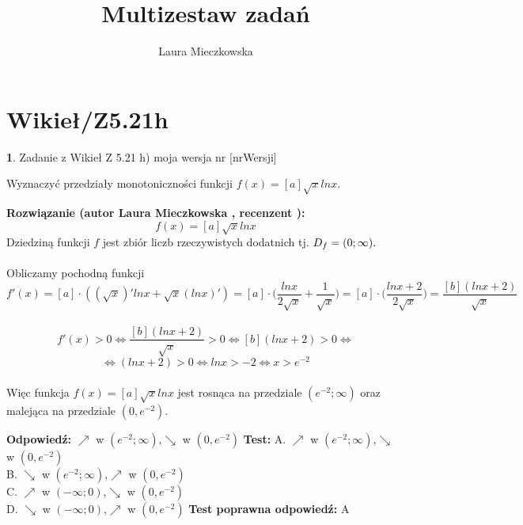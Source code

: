 \documentclass[12pt, a4paper]{article}
\title{Multizestaw zadań}
\author{Laura Mieczkowska}
\date{}
\theoremstyle{definition} %
\newtheorem{zad}{}
\newcommand{\kategoria}[1]{\section{#1}} %
\newcommand{\zadStart}[1]{\begin{zad}#1\newline} %
\newcommand{\zadStop}{\end{zad}}   %
\newcommand{\rozwStart}[2]{\noindent \textbf{Rozwiązanie (autor #1 , recenzent #2): }\newline} %
\newcommand{\odpStart}{\noindent \textbf{Odpowiedź:}\newline}    %
\newcommand{\odpStop}{\newline}                                             %
\newcommand{\testStart}{\noindent \textbf{Test:}\newline} %
\newcommand{\testStop}{\newline} %
\newcommand{\kluczStart}{\noindent \textbf{Test poprawna odpowiedź:}\newline} %
\newcommand{\kluczStop}{\newline} %
\begin{document}
\maketitle


\kategoria{Wikieł/Z5.21h}
\zadStart{Zadanie z Wikieł Z 5.21 h) moja wersja nr [nrWersji]}

Wyznaczyć przedziały monotoniczności funkcji $f(x)=[a]\sqrt{x}lnx$.
\zadStop
\rozwStart{Laura Mieczkowska}{}
$$f(x)=[a]\sqrt{x}lnx$$
Dziedziną funkcji $f$ jest zbiór liczb rzeczywistych dodatnich tj. $\mathnormal{D_f}=(0;\infty).$
\\\\Obliczamy pochodną funkcji
$$f'(x)=[a]\cdot((\sqrt{x})'lnx+\sqrt{x}(lnx)')=[a]\cdot\bigg(\frac{lnx}{2\sqrt{x}}+\frac{1}{\sqrt{x}}\bigg)=
[a]\cdot\bigg(\frac{lnx+2}{2\sqrt{x}}\bigg)=\frac{[b](lnx+2)}{\sqrt{x}}$$
\\
$$f'(x)>0\Leftrightarrow \frac{[b](lnx+2)}{\sqrt{x}}>0 \Leftrightarrow [b](lnx+2)>0 \Leftrightarrow$$
$$\Leftrightarrow (lnx+2)>0 \Leftrightarrow lnx>-2 \Leftrightarrow x>e^{-2}$$
\\Więc funkcja $f(x)=[a]\sqrt{x}lnx$ jest rosnąca na przedziale $(e^{-2};\infty)$ oraz malejąca na przedziale $(0,e^{-2})$.

\odpStart
$\nearrow$ w $(e^{-2};\infty)$,$\searrow$ w $(0,e^{-2})$
\odpStop
\testStart
A. $\nearrow$ w $(e^{-2};\infty)$,$\searrow$ w $(0,e^{-2})$\\
B. $\searrow$ w $(e^{-2};\infty)$,$\nearrow$ w $(0,e^{-2})$ \\
C. $\nearrow$ w $(-\infty;0)$,$\searrow$ w $(0,e^{-2})$ \\
D. $\searrow$ w $(-\infty;0)$,$\nearrow$ w $(0,e^{-2})$ 
\testStop
\kluczStart
A
\kluczStop
\end{document}

